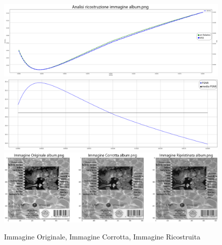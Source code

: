 \begin{figure}[H]
    \centering
    \includegraphics[width=\textwidth]{IMMAGINI_RELAZIONE/graficoAlbumTOTVAR_PSNR&suaMedia.png}
    \includegraphics[width=\textwidth]{IMMAGINI_RELAZIONE/graficoAlbumTOTVAR_ERRREL&MSE.png}
    \includegraphics[width=\textwidth]{IMMAGINI_RELAZIONE/eventuale_ricostruzioneTOTVAR_Album_33.71.png}
    \caption{Immagine Originale, Immagine Corrotta, Immagine Ricostruita}
\end{figure}
